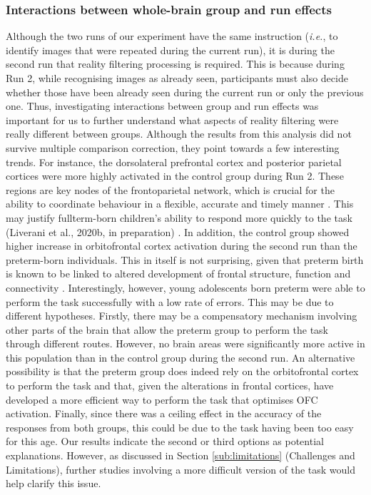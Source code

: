 \subsubsection{Interactions between whole-brain group and run effects}
Although the two runs of our experiment have the same instruction (\textit{i.e.}, to identify images that were repeated during the current run), it is during the second run that reality filtering processing is required. This is because during Run 2, while recognising images as already seen, participants must also decide whether those have been already seen during the current run or only the previous one. Thus, investigating interactions between group and run effects was important for us to further understand what aspects of reality filtering were really different between groups. Although the results from this analysis did not survive multiple comparison correction, they point towards a few interesting trends. For instance, the dorsolateral prefrontal cortex and posterior parietal cortices were more highly activated in the control group during Run 2. These regions are key nodes of the frontoparietal network, which is crucial for the ability to coordinate behaviour in a flexible, accurate and timely manner \cite{Marek2018}. This may justify fullterm-born children's ability to respond more quickly to the task (Liverani et al., 2020b, in preparation) . In addition, the control group showed higher increase in orbitofrontal cortex activation during the second run than the preterm-born individuals. This in itself is not surprising, given that preterm birth is known to be linked to altered development of frontal structure, function and connectivity \citep{Sripada2018}. Interestingly, however, young adolescents born preterm were able to perform the task successfully with a low rate of errors. This may be due to different hypotheses. Firstly, there may be a compensatory mechanism involving other parts of the brain that allow the preterm group to perform the task through different routes. However, no brain areas were significantly more active in this population than in the control group during the second run. An alternative possibility is that the preterm group does indeed rely on the orbitofrontal cortex to perform the task and that, given the alterations in frontal cortices, have developed a more efficient way to perform the task that optimises OFC activation. Finally, since there was a ceiling effect in the accuracy of the responses from both groups, this could be due to the task having been too easy for this age. Our results indicate the second or third options as potential explanations. However, as discussed in Section \ref{sub:limitations} (Challenges and Limitations), further studies involving a more difficult version of the task would help clarify this issue. 

